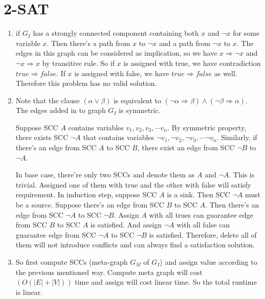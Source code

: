 \documentclass[11pt]{article}
\newenvironment{qparts}{\begin{enumerate}[{(}a{)}]}{\end{enumerate}}
\begin{document}
\section{2-SAT}
\begin{qparts}
	
	\item 

	if $G_I$ has a strongly connected component containing both $x$ and $\neg x$ for some variable $x$. Then there's a path from $x$ to $\neg x$ and a path from $\neg x$ to $x$. The edges in this graph can be considered as implication, so we have $x \Rightarrow  \neg x$ and $\neg x \Rightarrow  x$ by transitive rule.
	So if $x$ is assigned with true, we have contradiction $true\Rightarrow false$. If  $x$ is assigned with false, we have $true\Rightarrow false$ as well. Therefore this problem has no valid solution.
	
	\item
	
	Note that the clause $(\alpha \lor \beta)$ is equivalent to $(\neg \alpha  \Rightarrow \beta) \land (\neg \beta\Rightarrow  \alpha)$. The edges added in to graph $G_I$ is symmetric. 
	
	Suppose SCC $A$ contains variables $v_1, v_2, v_3, \cdots v_n$. By symmetric property, there exists SCC $\neg A$ that contains variables $\neg v_1, \neg v_2, \neg v_3, \cdots \neg v_n$. Similarly, if there's an edge from SCC $A$ to SCC $B$, there exist an edge from SCC $\neg B$ to $\neg A$.
	
	In base case, there're only two SCCs and denote them as $A$ and $\neg A$. This is trivial. Assigned one of them with true and the other with false will satisfy requirement. In induction step, suppose SCC $A$ is a sink. Then SCC $\neg A$ must be a source. Suppose there's an edge from SCC $B$ to SCC $A$. Then there's an edge from SCC $\neg A$ to SCC $\neg B$. Assign $A$ with all trues can guarantee edge from SCC $B$ to SCC $A$ is satisfied. And assign $\neg A$ with all false can guarantee edge from SCC $\neg A$ to SCC $\neg B$ is satisfied. Therefore, delete all of them will not introduce conflicts and can always find a satisfaction solution.
	
	\item
	
	So first compute SCCs (meta-graph $G_M$ of $G_I$) and assign value according to the previous mentioned way. Compute meta graph will cost $(O(|E| + |V|))$ time and assign will cost linear time. So the total runtime is linear.
		
\end{qparts}
\end{document}
